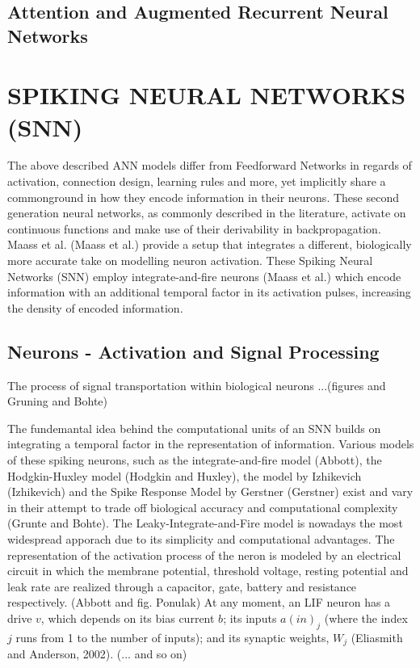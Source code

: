 \documentclass[letterpaper, 10 pt, conference]{ieeeconf}  %
\begin{document}
\subsection{Attention and Augmented Recurrent Neural Networks}


\section{SPIKING NEURAL NETWORKS (SNN)}

The above described ANN models differ from Feedforward Networks in regards of activation, connection design, learning rules and more, yet implicitly
share a commonground in how they encode information in their neurons. These second generation neural networks, as commonly described in the literature,
activate on continuous functions and make use of their derivability in backpropagation. Maass et al. (Maass et al.) provide a setup that
integrates a different, biologically more accurate take on modelling neuron activation. These Spiking Neural Networks (SNN) employ
integrate-and-fire neurons (Maass et al.) which encode information with an additional temporal factor in its activation pulses, increasing
the density of encoded information.  

\subsection{Neurons - Activation and Signal Processing} 

The process of signal transportation within biological neurons ...(figures and Gruning and Bohte)\newline

The fundemantal idea behind the computational units of an SNN builds on integrating a temporal factor 
in the representation of information. Various models of these spiking neurons, such as the integrate-and-fire model (Abbott), 
the Hodgkin-Huxley model (Hodgkin and Huxley), the model by Izhikevich (Izhikevich) and the Spike Response Model by Gerstner (Gerstner) 
exist and vary in their attempt to trade off biological accuracy and computational complexity (Grunte and Bohte).
The Leaky-Integrate-and-Fire model is nowadays the most widespread apporach due to its simplicity and computational advantages. 
The representation of the activation process of the neron is modeled by an electrical circuit in which the membrane potential, threshold voltage,
resting potential and leak rate are realized through a capacitor, gate, battery and resistance respectively. (Abbott and fig. Ponulak)
\newline
At any moment, an LIF neuron has a drive $v$, which depends on its bias
current $b$; its inputs $a(in)_j$ (where the index $j$ runs from 1 to the number
of inputs); and its synaptic weights, $W_j$ (Eliasmith and Anderson, 2002). (... and so on)
\end{document}
